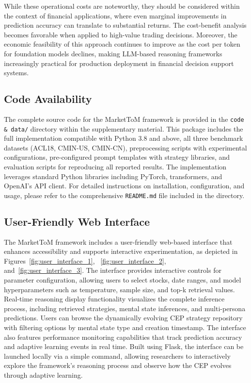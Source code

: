 \documentclass[letterpaper]{article} %
\begin{document}
While these operational costs are noteworthy, they should be considered within the context of financial applications, where even marginal improvements in prediction accuracy can translate to substantial returns. The cost-benefit analysis becomes favorable when applied to high-value trading decisions. Moreover, the economic feasibility of this approach continues to improve as the cost per token for foundation models declines, making LLM-based reasoning frameworks increasingly practical for production deployment in financial decision support systems.


\subsection*{Code Availability}
The complete source code for the MarketToM framework is provided in the \texttt{code \& data/} directory within the supplementary material. This package includes the full implementation compatible with Python 3.8 and above, all three benchmark datasets (ACL18, CMIN-US, CMIN-CN), preprocessing scripts with experimental configurations, pre-configured prompt templates with strategy libraries, and evaluation scripts for reproducing all reported results. The implementation leverages standard Python libraries including PyTorch, transformers, and OpenAI's API client. For detailed instructions on installation, configuration, and usage, please refer to the comprehensive \texttt{README.md} file included in the directory.


\subsection*{User-Friendly Web Interface}
The MarketToM framework includes a user-friendly web-based interface that enhances accessibility and supports interactive experimentation, as depicted in Figures~\ref{fig:user_interface_1}, ~\ref{fig:user_interface_2}, and~\ref{fig:user_interface_3}. The interface provides interactive controls for parameter configuration, allowing users to select stocks, date ranges, and model hyperparameters such as temperature, sample size, and top-k retrieval values. Real-time reasoning display functionality visualizes the complete inference process, including retrieved strategies, mental state inferences, and multi-persona predictions. Users can browse the dynamically evolving CEP strategy repository with filtering options by mental state type and creation timestamp. The interface also features performance monitoring capabilities that track prediction accuracy and adaptive learning events in real time. Built using Flask, the interface can be launched locally via a simple command, allowing researchers to interactively explore the framework's reasoning process and observe how the CEP evolves through adaptive learning.


\end{document}
